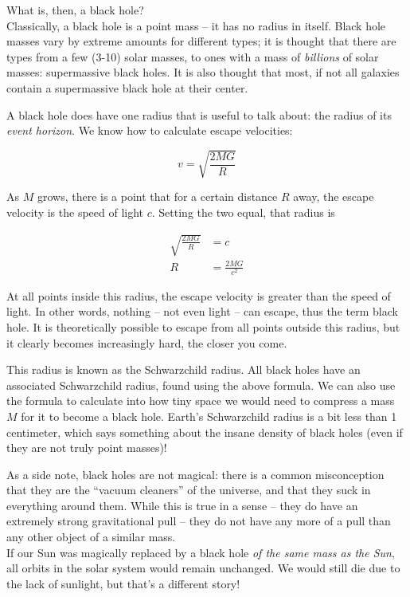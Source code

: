 \documentclass[8.01x]{subfiles}
\begin{document}
What is, then, a black hole?\\
Classically, a black hole is a point mass -- it has no radius in itself. Black hole masses vary by extreme amounts for different types; it is thought that there are types from a few (3-10) solar masses, to ones with a mass of \emph{billions} of solar masses: supermassive black holes. It is also thought that most, if not all galaxies contain a supermassive black hole at their center.

A black hole does have one radius that is useful to talk about: the radius of its \emph{event horizon}. We know how to calculate escape velocities:

\begin{equation}
v = \sqrt{\frac{2 M G}{R}}
\end{equation}

As $M$ grows, there is a point that for a certain distance $R$ away, the escape velocity is the speed of light $c$. Setting the two equal, that radius is

\begin{align}
\sqrt{\frac{2 M G}{R}} &= c\\
R &= \frac{2 M G}{c^2}
\end{align}

At all points inside this radius, the escape velocity is greater than the speed of light. In other words, nothing -- not even light -- can escape, thus the term black hole. It is theoretically possible to escape from all points outside this radius, but it clearly becomes increasingly hard, the closer you come.

This radius is known as the Schwarzchild radius. All black holes have an associated Schwarzchild radius, found using the above formula. We can also use the formula to calculate into how tiny space we would need to compress a mass $M$ for it to become a black hole. Earth's Schwarzchild radius is a bit less than 1 centimeter, which says something about the insane density of black holes (even if they are not truly point masses)!

As a side note, black holes are not magical: there is a common misconception that they are the ``vacuum cleaners'' of the universe, and that they suck in everything around them. While this is true in a sense -- they do have an extremely strong gravitational pull -- they do not have any more of a pull than any other object of a similar mass.\\
If our Sun was magically replaced by a black hole \emph{of the same mass as the Sun}, all orbits in the solar system would remain unchanged. We would still die due to the lack of sunlight, but that's a different story!
\end{document}
